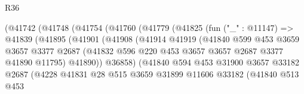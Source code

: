 \begin{lexlean}{R36}
\begin{coremodule}
                          (@41742
                            (@41748
                              (@41754
                                (@41760
                                  (@41779
                                    (@41825
                                      (fun ("_" : @11147) =>
                                      @41839
                                        (@41895
                                          (@41901
                                            (@41908
                                              (@41914
                                                @41919
                                                (@41840
                                                  @599
                                                  @453
                                                  @3659
                                                  @3657
                                                  @3377
                                                  @2687
                                                  (@41832
                                                    @596
                                                    @220
                                                    @453
                                                    @3657
                                                    @3657
                                                    @2687
                                                    @3377
                                                    @41890
                                                    @11795)
                                                  @41890))
                                              @36858)
                                            (@41840
                                              @594
                                              @453
                                              @31900
                                              @3657
                                              @33182
                                              @2687
                                              (@4228
                                                @41831
                                                @28
                                                @515
                                                @3659
                                                @31899
                                                @11606
                                                @33182
                                                (@41840
                                                  @513
                                                  @453

\end{coremodule}
\end{lexlean}
